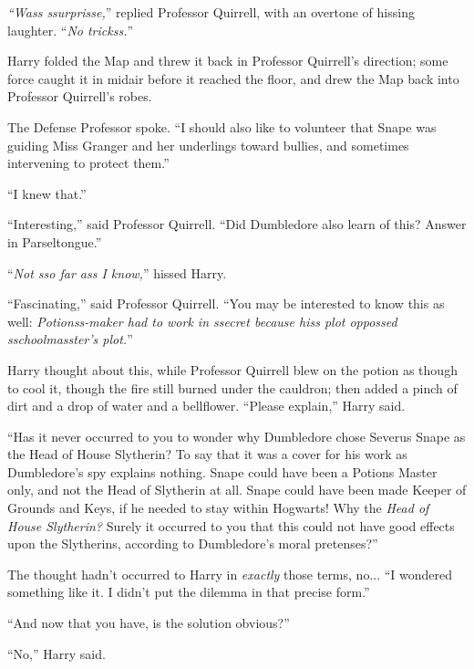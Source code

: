 \emph{``Wass ssurprisse,}'' replied Professor Quirrell, with an overtone of hissing laughter. ``\emph{No trickss.}''

Harry folded the Map and threw it back in Professor Quirrell's direction; some force caught it in midair before it reached the floor, and drew the Map back into Professor Quirrell's robes.

The Defense Professor spoke. ``I should also like to volunteer that Snape was guiding Miss Granger and her underlings toward bullies, and sometimes intervening to protect them.''

``I knew that.''

``Interesting,'' said Professor Quirrell. ``Did Dumbledore also learn of this? Answer in Parseltongue.''

``\emph{Not sso far ass I know,}'' hissed Harry.

``Fascinating,'' said Professor Quirrell. ``You may be interested to know this as well: \emph{Potionss-maker had to work in ssecret because hiss plot oppossed sschoolmasster's plot.}''

Harry thought about this, while Professor Quirrell blew on the potion as though to cool it, though the fire still burned under the cauldron; then added a pinch of dirt and a drop of water and a bellflower. ``Please explain,'' Harry said.

``Has it never occurred to you to wonder why Dumbledore chose Severus Snape as the Head of House Slytherin? To say that it was a cover for his work as Dumbledore's spy explains nothing. Snape could have been a Potions Master only, and not the Head of Slytherin at all. Snape could have been made Keeper of Grounds and Keys, if he needed to stay within Hogwarts! Why the \emph{Head of House Slytherin?} Surely it occurred to you that this could not have good effects upon the Slytherins, according to Dumbledore's moral pretenses?''

The thought hadn't occurred to Harry in \emph{exactly} those terms, no... ``I wondered something like it. I didn't put the dilemma in that precise form.''

``And now that you have, is the solution obvious?''

``No,'' Harry said.

